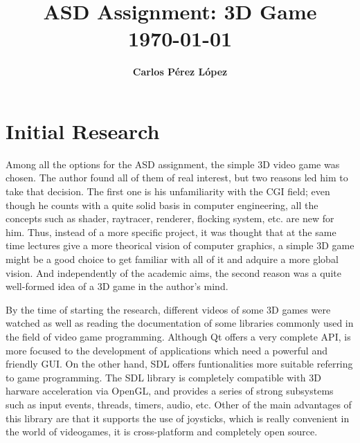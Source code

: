 \documentclass[]{article}
\title{
\vspace{2in}
\textmd{\textbf{ASD Assignment: 3D Game}}\\
\vspace{0.1in}
{\today}\\
\vspace{3in}
}
\author{\textbf{Carlos Pérez López}}
\date{}
\begin{document}
\maketitle %


\setlength\parindent{24pt} %

\renewcommand{\labelenumi}{\alph{enumi}.} %


\newpage
\tableofcontents
\newpage



\section{Initial Research}

Among all the options for the ASD assignment, the simple 3D video game was chosen. The author found all of them of real interest, but two reasons led him to take that decision. 
The first one is his unfamiliarity with the CGI field; even though he counts with a quite solid basis in computer engineering, all the concepts such as shader, raytracer, renderer, 
flocking system, etc. are new for him. Thus, instead of a more specific project, it was thought that at the same time lectures give a more theorical vision of computer graphics, 
a simple 3D game might be a good choice to get familiar with all of it and adquire a more global vision. And independently of the academic aims, the second reason was a quite well-formed 
idea of a 3D game in the author's mind.

By the time of starting the research, different videos of some 3D games were watched as well as reading the documentation of some libraries commonly used in the field of 
video game programming. Although Qt offers a very complete API, is more focused to the development of applications which need a powerful and friendly GUI. On the other hand, SDL offers 
funtionalities more suitable referring to game programming. The SDL library \cite{sdl} is completely compatible with 3D harware acceleration via OpenGL, and provides a series of strong subsystems
 such as input events, threads, timers, audio, etc. Other of the main advantages of this library are that it supports the use of joysticks, which is really convenient in the world of videogames,
 it is cross-platform and completely open source.
 
\end{document}

